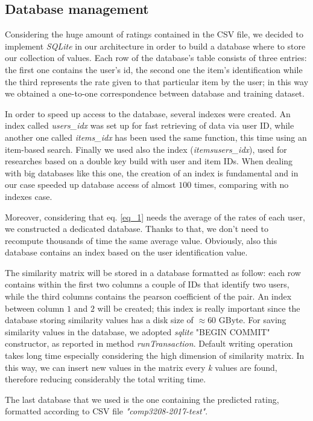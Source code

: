 \subsection{Database management}

Considering the huge amount of ratings contained in the CSV file, we decided to implement \textit{SQLite} in our architecture in order to build a database where to store our collection of values. Each row of the database's table consists of three entries: the first one contains the user's id, the second one the item's identification while the third represents the rate given to that particular item by the user; in this way we obtained a one-to-one correspondence between database and training dataset. 

In order to speed up access to the database, several indexes were created. An index called \textit{users\_idx} was set up for fast retrieving of data via user ID, while another one called \textit{items\_idx} has been used the same function, this time using an item-based search. Finally we used also the index (\textit{itemsusers\_idx}), used for researches based on a double key build with user and item IDs. When dealing with big databases like this one, the creation of an index is fundamental and in our case speeded up database access of almost $100$ times, comparing with no indexes case.

Moreover, considering that eq. \ref{eq_1} needs the average of the rates of each user, we constructed a dedicated database. Thanks to that, we don't need to recompute thousands of time the same average value. Obviously, also this database contains an index based on the user identification value. 

The similarity matrix will be stored in a database formatted as follow: each row contains within the first two columns a couple of IDs that identify two users, while the third columns contains the pearson coefficient of the pair. An index between column $1$ and $2$ will be created; this index is really important since the database storing similarity values has a disk size of $\approx 60$ GByte. For saving similarity values in the database, we adopted \textit{sqlite} "BEGIN COMMIT" constructor, as reported in method \textit{runTransaction}. Default writing operation takes long time especially considering the high dimension of similarity matrix. In this way, we can insert new values in the matrix every \textit{k} values are found, therefore reducing considerably the total writing time.


The last database that we used is the one containing the predicted rating, formatted according to CSV file \textit{"comp3208-2017-test"}.

